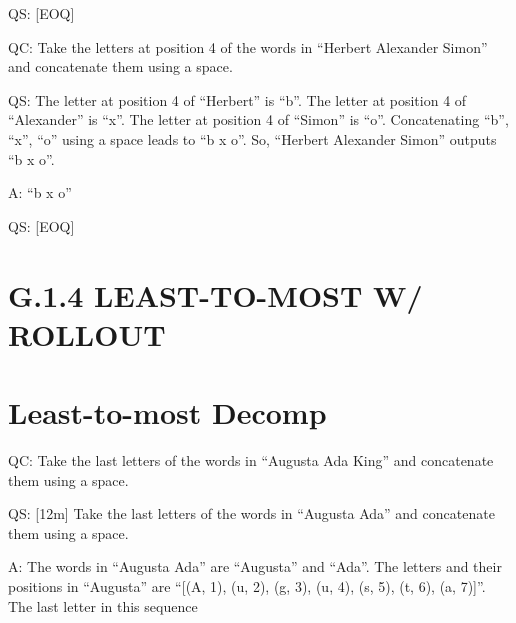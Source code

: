 \documentclass[
]{article}
\begin{document}
QS: {[}EOQ{]}

QC: Take the letters at position 4 of the words in ``Herbert Alexander
Simon'' and concatenate them using a space.

QS: The letter at position 4 of ``Herbert'' is ``b''. The letter at
position 4 of ``Alexander'' is ``x''. The letter at position 4 of
``Simon'' is ``o''. Concatenating ``b'', ``x'', ``o'' using a space
leads to ``b x o''. So, ``Herbert Alexander Simon'' outputs ``b x o''.

A: ``b x o''

QS: {[}EOQ{]}

\section{G.1.4 LEAST-TO-MOST W/
ROLLOUT}\label{g.1.4-least-to-most-w-rollout}

\section{Least-to-most Decomp}\label{least-to-most-decomp}

QC: Take the last letters of the words in ``Augusta Ada King'' and
concatenate them using a space.

QS: {[}12m{]} Take the last letters of the words in ``Augusta Ada'' and
concatenate them using a space.

A: The words in ``Augusta Ada'' are ``Augusta'' and ``Ada''. The letters
and their positions in ``Augusta'' are ``{[}(A, 1), (u, 2), (g, 3), (u,
4), (s, 5), (t, 6), (a, 7){]}''. The last letter in this sequence
\end{document}
